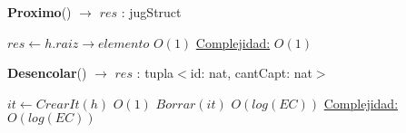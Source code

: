 \begin{Algoritmos}
\begin{algorithm}[H]{\textbf{Proximo}() $\to$ $res$ : jugStruct}
    	\begin{algorithmic}[1]
    		 \State $res \gets h.raiz \rightarrow elemento$ \Comment $O(1)$
    		 \medskip
			\Statex \underline{Complejidad:} $O(1)$
    	\end{algorithmic}
\end{algorithm}

\begin{algorithm}[H]{\textbf{Desencolar}() $\to$ $res$ : tupla$<$id: nat, cantCapt: nat$>$}
    	\begin{algorithmic}[1]
    		 \State $it \gets CrearIt(h)$ \Comment $O(1)$
    		 \State $Borrar(it)$ \Comment $O(log(EC))$
    		 \medskip
			\Statex \underline{Complejidad:} $O(log(EC))$
    	\end{algorithmic}
\end{algorithm}

\end{Algoritmos}

\begin{Algoritmos}

\end{Algoritmos}